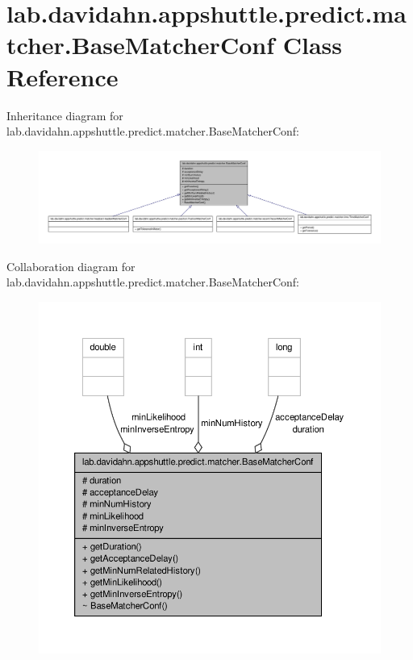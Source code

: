 \hypertarget{classlab_1_1davidahn_1_1appshuttle_1_1predict_1_1matcher_1_1_base_matcher_conf}{\section{lab.\-davidahn.\-appshuttle.\-predict.\-matcher.\-Base\-Matcher\-Conf \-Class \-Reference}
\label{classlab_1_1davidahn_1_1appshuttle_1_1predict_1_1matcher_1_1_base_matcher_conf}
}


\-Inheritance diagram for lab.\-davidahn.\-appshuttle.\-predict.\-matcher.\-Base\-Matcher\-Conf\-:
\nopagebreak
\begin{figure}[H]
\begin{center}
\leavevmode
\includegraphics[width=350pt]{classlab_1_1davidahn_1_1appshuttle_1_1predict_1_1matcher_1_1_base_matcher_conf__inherit__graph}
\end{center}
\end{figure}


\-Collaboration diagram for lab.\-davidahn.\-appshuttle.\-predict.\-matcher.\-Base\-Matcher\-Conf\-:
\nopagebreak
\begin{figure}[H]
\begin{center}
\leavevmode
\includegraphics[width=350pt]{classlab_1_1davidahn_1_1appshuttle_1_1predict_1_1matcher_1_1_base_matcher_conf__coll__graph}
\end{center}
\end{figure}
